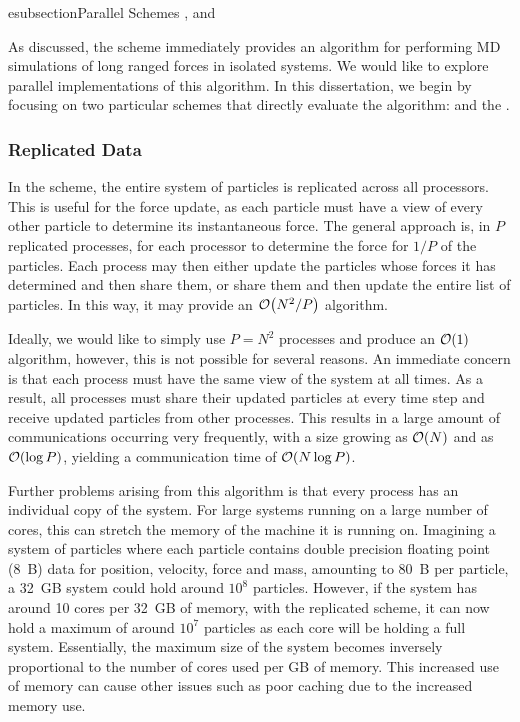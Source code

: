 esubsection{Parallel Schemes}
,
 and

%
As discussed, the \velocityverlet{} scheme
immediately provides an algorithm for
performing MD simulations of long ranged forces in isolated systems.
%
We would like to explore parallel implementations of this algorithm.
%
In this dissertation, we begin by focusing on two particular schemes
that directly evaluate the \velocityverlet{} algorithm:
\replicateddata{} and the \systolicloop{}.



\subsubsection{Replicated Data}
\label{sec:background:subsec:replicated_data}

%
In the \replicateddata{} scheme,
the entire system of particles is replicated across all processors.
%
This is useful for the force update, as each particle must have a view of
every other particle to determine its instantaneous force.
%
The general approach is, in $P$ replicated processes, for each processor
to determine the force for $1/P$ of the particles.
%
Each process may then either update the particles whose forces it has
determined and then share them, or share them and then update the entire
list of particles.
%
In this way, it may provide an $\mathcal{O}{\left({ N^2/P }\right)}$ algorithm.

%
Ideally, we would like to simply use $P = N^2$ processes and produce an
$\mathcal{O}{\left({ 1 }\right)}$ algorithm, however, this is not possible for several reasons.
%
An immediate concern is that each process must have the same view of the
system at all times.
%
As a result, all processes must share their updated particles at
every time step and receive updated particles from other processes.
%
This results in a large amount of communications occurring very frequently,
with a size growing as $\mathcal{O}{\left({ N }\right)}$ and as $\mathcal{O}{\left({ \log{P} }\right)}$,
yielding a communication time of $\mathcal{O}{\left({ N \log{P} }\right)}$.

Further problems arising from this algorithm is that every process has
an individual copy of the system.
%
For large systems running on a large number of cores,
this can stretch the memory of the machine it is running on.
%
Imagining a system of particles where each particle contains double
precision floating point (8~B) data for position, velocity, force and mass,
amounting to 80~B per particle, a 32~GB system could hold around $10^8$
particles.
%
However, if the system has around 10 cores per 32~GB of memory,
with the replicated scheme,
it can now hold a maximum of around $10^7$ particles
as each core will be holding a full system.
%
Essentially, the maximum size of the system becomes inversely proportional
to the number of cores used per GB of memory.
%
This increased use of memory can cause other issues such as poor caching
due to the increased memory use.

